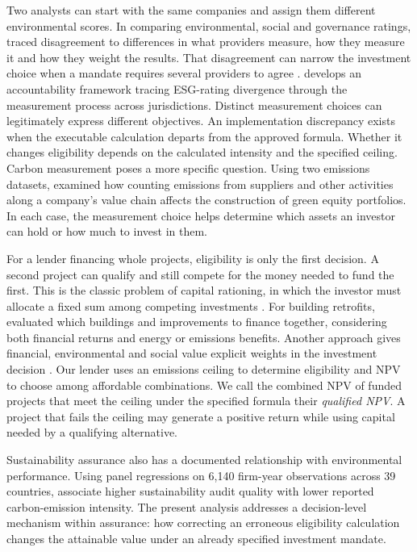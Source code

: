 Two analysts can start with the same companies and assign them different environmental scores. In comparing environmental, social and governance ratings, \citet{berg} traced disagreement to differences in what providers measure, how they measure it and how they weight the results. That disagreement can narrow the investment choice when a mandate requires several providers to agree \citep{lohmann}. \citet{tian2026} develops an accountability framework tracing ESG-rating divergence through the measurement process across jurisdictions. Distinct measurement choices can legitimately express different objectives. An implementation discrepancy exists when the executable calculation departs from the approved formula. Whether it changes eligibility depends on the calculated intensity and the specified ceiling. Carbon measurement poses a more specific question. Using two emissions datasets, \citet{anquetin} examined how counting emissions from suppliers and other activities along a company's value chain affects the construction of green equity portfolios. In each case, the measurement choice helps determine which assets an investor can hold or how much to invest in them.

For a lender financing whole projects, eligibility is only the first decision. A second project can qualify and still compete for the money needed to fund the first. This is the classic problem of capital rationing, in which the investor must allocate a fixed sum among competing investments \citep{lorie}. For building retrofits, \citet{he} evaluated which buildings and improvements to finance together, considering both financial returns and energy or emissions benefits. Another approach gives financial, environmental and social value explicit weights in the investment decision \citep{schoenmaker}. Our lender uses an emissions ceiling to determine eligibility and NPV to choose among affordable combinations. We call the combined NPV of funded projects that meet the ceiling under the specified formula their \emph{qualified NPV}. A project that fails the ceiling may generate a positive return while using capital needed by a qualifying alternative.

Sustainability assurance also has a documented relationship with environmental performance. Using panel regressions on 6,140 firm-year observations across 39 countries, \citet{ibrahim2026} associate higher sustainability audit quality with lower reported carbon-emission intensity. The present analysis addresses a decision-level mechanism within assurance: how correcting an erroneous eligibility calculation changes the attainable value under an already specified investment mandate.

